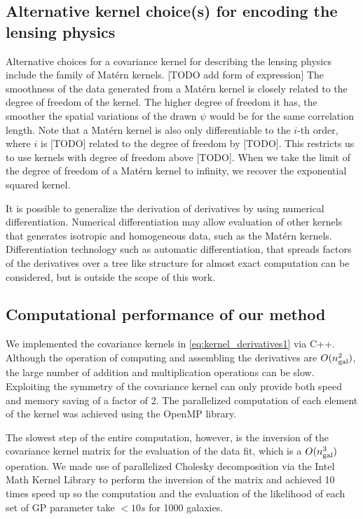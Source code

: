 \subsection{Alternative kernel choice(s) for encoding the lensing physics}
Alternative choices for a covariance kernel for describing the lensing physics 
include the family of Mat\'{e}rn kernels.
[TODO add form of expression] 
The smoothness of the data generated from a Mat\'{e}rn kernel is closely
related to the degree of freedom of the kernel. 
The higher degree of freedom it has, the smoother the spatial variations of the
drawn $\psi$ would be for the same correlation length.
Note that a Mat\'{e}rn kernel is also only differentiable to the $i$-th order,
where $i$ is [TODO] related to the degree of freedom by [TODO].
This restricts us to use kernels with degree of freedom above [TODO]. 
When we take the limit of the degree of freedom of a Mat\'{e}rn kernel to infinity, 
we recover the exponential squared kernel.

It is possible to generalize the derivation of derivatives by using numerical
differentiation. Numerical differentiation may allow evaluation of other
kernels that generates isotropic and homogeneous data, 
such as the Mat\'{e}rn kernels.
Differentiation technology such as automatic differentiation, 
that spreads factors of the derivatives over a tree like structure for
almost exact computation can be considered, but is outside the scope of this work.

\subsection{Computational performance of our method}
We implemented the covariance kernels in \ref{eq:kernel_derivatives1}
via {\sc C++}. Although the operation of computing and assembling the
derivatives are $O(n_{\rm gal}^2)$, the large number of addition and 
multiplication operations can be slow.
Exploiting the symmetry of the covariance kernel can only provide both speed and
memory saving of a factor of 2.
The parallelized computation of each element of the kernel was achieved using 
the OpenMP library. 


The slowest step of the entire computation, however, is the inversion of the
covariance kernel matrix for the evaluation of the data fit, 
which is a $O(n_{\rm gal}^3)$ operation. 
We made use of parallelized Cholesky decomposition via the Intel Math Kernel Library
to perform the inversion of the matrix and achieved 10 times speed up so the
computation and the evaluation of the likelihood of each set of GP parameter
take $< 10s$ for 1000 galaxies.

